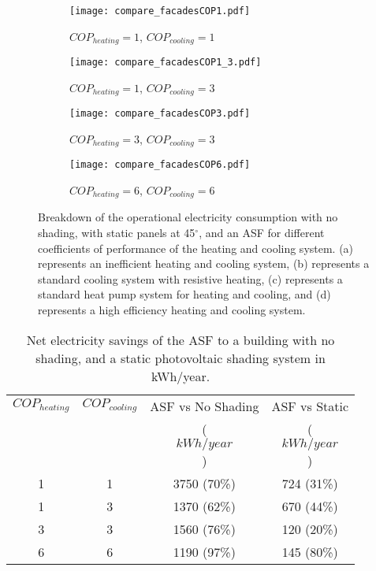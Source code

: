 \begin{figure}
    \centering
    \begin{subfigure}[b]{0.47\textwidth}
        \texttt{[image: compare\_facadesCOP1.pdf]}
        \caption{$COP_{heating}=1$, $COP_{cooling}=1$} 
        \label{fig:COP11}
    \end{subfigure} \hfill
    \begin{subfigure}[b]{0.47\textwidth}
        \texttt{[image: compare\_facadesCOP1\_3.pdf]}
        \caption{$COP_{heating}=1$, $COP_{cooling}=3$}
        \label{fig:COP13}
    \end{subfigure}
    \vspace{10mm}

    \begin{subfigure}[b]{0.47\textwidth}
        \texttt{[image: compare\_facadesCOP3.pdf]}
        \caption{$COP_{heating}=3$, $COP_{cooling}=3$}
        \label{fig:COP33}
    \end{subfigure}
    \hfill
    \begin{subfigure}[b]{0.47\textwidth}
        \texttt{[image: compare\_facadesCOP6.pdf]}
        \caption{$COP_{heating}=6$, $COP_{cooling}=6$}
        \label{fig:COP66}
    \end{subfigure}
    \caption{Breakdown of the operational electricity consumption with no shading, with static panels at 45$^{\circ}$, and an ASF for different coefficients of performance of the heating and cooling system. (a) represents an inefficient heating and cooling system, (b) represents a standard cooling system with resistive heating, (c) represents a standard heat pump system for heating and cooling, and (d) represents a high efficiency heating and cooling system.}
    \label{fig:compare}
\end{figure}

\begin{table}
\centering

\begin{tabular}{cc|cc}


$COP_{heating}$ & $COP_{cooling}$ & ASF vs No Shading & ASF vs Static  \\
                &                 & ($$kWh/year$$)    & ($$kWh/year$$) \\
\hline 
1               & 1               & 3750  (70\%)     & 724  (31\%)   \\
1               & 3               & 1370  (62\%)      & 670  (44\%)    \\
3               & 3               & 1560  (76\%)      & 120  (20\%)    \\
6               & 6               & 1190  (97\%)      & 145  (80\%)    \\

\end{tabular}
\caption{Net electricity savings of the ASF to a building with no shading, and a static photovoltaic shading system in kWh/year.}
\label{tab:compare}
\end{table}


